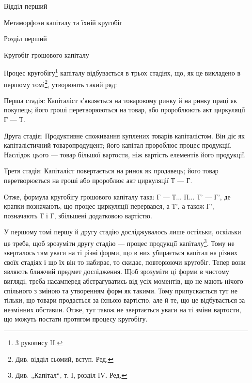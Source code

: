 \parcont{}  %
Відділ перший

Метаморфози капіталу та їхній кругобіг

Розділ перший

Кругобіг грошового капіталу

Процес кругобігу\footnote{
3 рукопису II.
} капіталу відбувається в трьох стадіях, що, як
це викладено в першому томі\footnote*{
Див. відділ сьомий, вступ. Ред.
}, утворюють такий ряд:

Перша стадія: Капіталіст з’являється на товаровому ринку й на
ринку праці як покупець; його гроші перетворюються на товар, або пророблюють
акт циркуляції Г — Т.

Друга стадія: Продуктивне споживання куплених товарів капіталістом.
Він діє як капіталістичний товаропродуцент; його капітал пророблює
процес продукції. Наслідок цього — товар більшої вартости, ніж
вартість елементів його продукції.

Третя стадія: Капіталіст повертається на ринок як продавець; його
товар перетворюється на гроші або пророблює акт циркуляції Т — Г.

Отже, формула кругобігу грошового капіталу така: Г — Т... П... Т' —
Г', де крапки позначають, що процес циркуляції перервався, а Т', а
також Г', позначають Т і Г, збільшені додатковою вартістю.

У першому томі першу й другу стадію досліджувалось лише остільки,
оскільки це треба, щоб зрозуміти другу стадію — процес продукції капіталу\footnote*{
Див. „Капітал“, т. І, розділ IV. Ред.
}.
Тому не зверталось там уваги на ті різні форми, що в них убирається
капітал на різних своїх стадіях і що їх він то набирає, то скидає,
повторюючи кругобіг. Тепер вони являють ближчий предмет дослідження.
Щоб зрозуміти ці форми в чистому вигляді, треба насамперед абстрагуватись
від усіх моментів, що не мають нічого спільного з зміною та
утворенням форм як такими. Тому припускається тут не тільки, що товари
продається за їхньою вартістю, але й те, що це відбувається за
незмінних обставин. Отже, тут також не звертається уваги на ті зміни
вартости, що можуть постати протягом процесу кругобігу.
